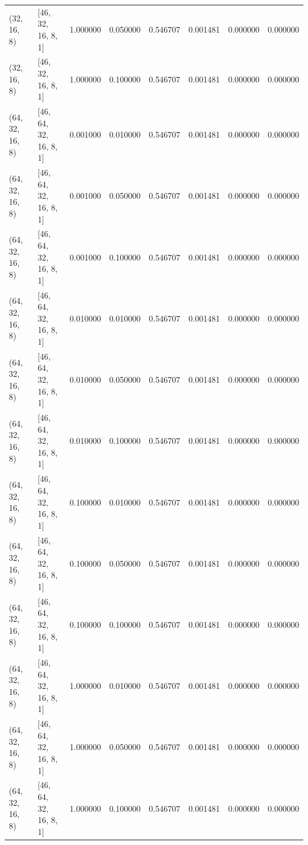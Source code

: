 \begin{tabular}{llrrrrrr}
(32, 16, 8) & [46, 32, 16, 8, 1] & 1.000000 & 0.050000 & 0.546707 & 0.001481 & 0.000000 & 0.000000 \\
(32, 16, 8) & [46, 32, 16, 8, 1] & 1.000000 & 0.100000 & 0.546707 & 0.001481 & 0.000000 & 0.000000 \\
(64, 32, 16, 8) & [46, 64, 32, 16, 8, 1] & 0.001000 & 0.010000 & 0.546707 & 0.001481 & 0.000000 & 0.000000 \\
(64, 32, 16, 8) & [46, 64, 32, 16, 8, 1] & 0.001000 & 0.050000 & 0.546707 & 0.001481 & 0.000000 & 0.000000 \\
(64, 32, 16, 8) & [46, 64, 32, 16, 8, 1] & 0.001000 & 0.100000 & 0.546707 & 0.001481 & 0.000000 & 0.000000 \\
(64, 32, 16, 8) & [46, 64, 32, 16, 8, 1] & 0.010000 & 0.010000 & 0.546707 & 0.001481 & 0.000000 & 0.000000 \\
(64, 32, 16, 8) & [46, 64, 32, 16, 8, 1] & 0.010000 & 0.050000 & 0.546707 & 0.001481 & 0.000000 & 0.000000 \\
(64, 32, 16, 8) & [46, 64, 32, 16, 8, 1] & 0.010000 & 0.100000 & 0.546707 & 0.001481 & 0.000000 & 0.000000 \\
(64, 32, 16, 8) & [46, 64, 32, 16, 8, 1] & 0.100000 & 0.010000 & 0.546707 & 0.001481 & 0.000000 & 0.000000 \\
(64, 32, 16, 8) & [46, 64, 32, 16, 8, 1] & 0.100000 & 0.050000 & 0.546707 & 0.001481 & 0.000000 & 0.000000 \\
(64, 32, 16, 8) & [46, 64, 32, 16, 8, 1] & 0.100000 & 0.100000 & 0.546707 & 0.001481 & 0.000000 & 0.000000 \\
(64, 32, 16, 8) & [46, 64, 32, 16, 8, 1] & 1.000000 & 0.010000 & 0.546707 & 0.001481 & 0.000000 & 0.000000 \\
(64, 32, 16, 8) & [46, 64, 32, 16, 8, 1] & 1.000000 & 0.050000 & 0.546707 & 0.001481 & 0.000000 & 0.000000 \\
(64, 32, 16, 8) & [46, 64, 32, 16, 8, 1] & 1.000000 & 0.100000 & 0.546707 & 0.001481 & 0.000000 & 0.000000 \\
\bottomrule
\end{tabular}

